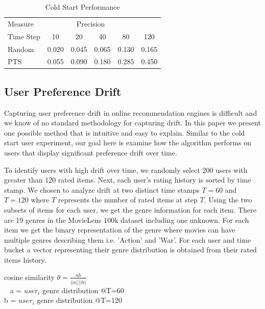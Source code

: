 \documentclass{article}
\begin{document}
\begin{table}[ht]
\caption{Cold Start Performance}
\label{sample-table}
\vskip 0.15in
\begin{center}
\begin{small}
\begin{sc}
\begin{tabular}{lccccc}
\toprule
Measure & \multicolumn{4}{c}{Precision}\\
Time Step  & 10     & 20     & 40   & 80    & 120 \\
\midrule
Random  &  0.020 & 0.045 & 0.065 & 0.130 & 0.165 \\
PTS     &  0.055 & 0.090 & 0.180 & 0.285 & 0.450 \\
\bottomrule
\end{tabular}
\end{sc}
\end{small}
\end{center}
\vskip -0.1in
\end{table}

\subsection{User Preference Drift}

Capturing user preference drift in online recommendation engines is difficult and we know of no standard methodology for capturing drift. In this paper we present one possible method that is intuitive and easy to explain. Similar to the cold start user experiment, our goal here is examine how the algorithm performs on users that display significant preference drift over time.  

To identify users with high drift over time, we randomly select 200 users with greater than 120 rated items. Next, each user's rating history is sorted by time stamp. We chosen to analyze drift at two distinct time stamps $T=60$ and $T=120$ where $T$ represents the number of rated items at step $T$. Using the two subsets of items for each user, we get the genre information for each item. There are 19 genres in the MovieLens 100k dataset including one unknown. For each item we get the binary representation of the genre where movies can have multiple genres describing them i.e. 'Action' and 'War'. For each user and time bucket a vector representing their genre distribution is obtained from their rated items history.

\begin{center}
cosine similarity $\theta = \frac{a \dot b}{||a|| \dot ||b||}$ \\
\ \newline
a = $user_i$ genre distribution @T=60 \\
b = $user_i$ genre distribution @T=120 \\
\end{center}
\end{document}
